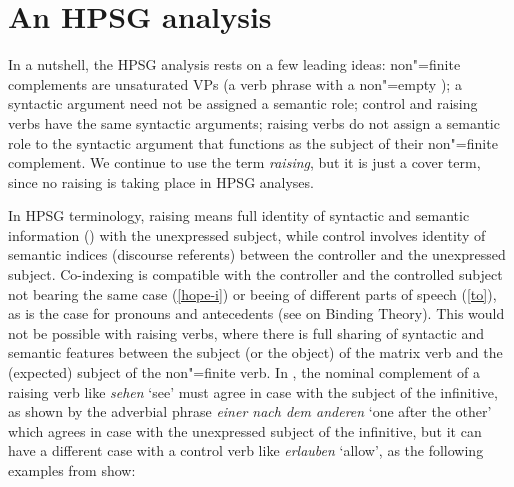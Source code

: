 \eal
{}
\zl
{}

\section{An HPSG analysis}


In a nutshell, the HPSG analysis rests on a few leading ideas: non"=finite complements are
unsaturated VPs (a verb phrase with a non"=empty \subjl); a syntactic argument need not be assigned
a semantic role; control and raising verbs have the same syntactic arguments; raising verbs do not
assign a semantic role to the syntactic argument that functions as the subject of their non"=finite
complement. We continue to use the term \emph{raising}, but it is just a cover term, since no raising
is taking place in HPSG analyses. 

In HPSG terminology, raising means full identity of syntactic and semantic
information () \crossrefchapterp[\pageref{ex:prop22}--\pageref{ex:prop24}]{properties} with the unexpressed subject, while
control involves identity of semantic indices (discourse referents) between the controller and the
unexpressed subject. Co-indexing is compatible with the controller and the controlled subject not
bearing the same case (\ref{hope-i}) or beeing of different parts of speech (\ref{to}), as is the
case for pronouns and antecedents (see  on Binding Theory). This would not be possible
with raising verbs, where there is full sharing of syntactic and semantic features between the
subject (or the object) of the matrix verb and the (expected) subject of the non"=finite verb. In
, the nominal complement of a raising verb like \emph{sehen} `see' must agree in case
with the subject of the infinitive, as shown by the adverbial phrase \emph{einer nach dem anderen} `one after the other' which
agrees in case with the unexpressed subject of the infinitive, but it can have a different case with
a control verb like \emph{erlauben} `allow', as the following examples from  show: 



